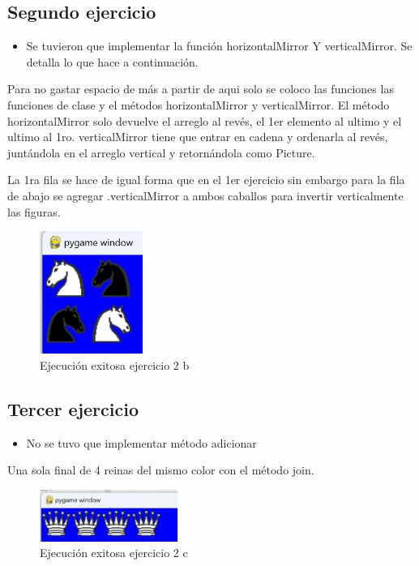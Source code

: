 \documentclass{article}
\begin{document}
	\subsection{Segundo ejercicio}
	\begin{itemize}	
		\item Se tuvieron que implementar la función horizontalMirror Y verticalMirror. 
		Se detalla lo que hace a continuación.
	\end{itemize}
	
	Para no gastar espacio de más a partir de aqui solo se coloco las funciones las funciones de clase
	y el métodos horizontalMirror y verticalMirror. El método horizontalMirror solo 
	devuelve el arreglo al revés, el 1er elemento al ultimo y el ultimo al 1ro. verticalMirror
	tiene que entrar en cadena y ordenarla al revés, juntándola en el arreglo vertical y 
	retornándola como Picture.
	
	La 1ra fila se hace de igual forma que en el 1er ejercicio sin embargo para la fila de abajo 
	se agregar .verticalMirror a ambos caballos para invertir verticalmente las figuras.
	\begin{figure}[H]
		\centering
		\includegraphics[width=0.3\textwidth,keepaspectratio]{img/e2b.png}
		\caption{Ejecución exitosa ejercicio 2 b}
	\end{figure}
	\subsection{Tercer ejercicio}
	\begin{itemize}	
		\item No se tuvo que implementar método adicionar
	\end{itemize}
	
	Una sola final de 4 reinas del mismo color con el método join.
	\begin{figure}[H]
		\centering
		\includegraphics[width=0.4\textwidth,keepaspectratio]{img/e2c.png}
		\caption{Ejecución exitosa ejercicio 2 c}
	\end{figure}
\end{document}
